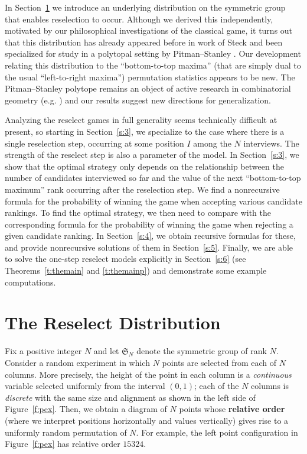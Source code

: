 \documentclass[11pt]{amsart}   %
\theoremstyle{definition}
\theoremstyle{remark}
\numberwithin{equation}{section}
\theoremstyle{theorem}
\renewcommand{\S}{\mathcal{S}}
\renewcommand{\S}{\mathfrak{S}}
\begin{document}
In Section~\ref{s:2} we introduce an underlying distribution on the symmetric
group that enables reselection to occur.  Although we derived this
independently, motivated by our philosophical investigations of the classical
game, it turns out that this distribution has already appeared before in work
of Steck \cite{steck} and been specialized for study in a polytopal setting by
Pitman--Stanley \cite{pitman--stanley}.  Our development relating this
distribution to the ``bottom-to-top maxima'' (that are simply dual to the usual
``left-to-right maxima'') permutation statistics appears to be new.
The Pitman--Stanley polytope remains an object of active research in combinatorial
geometry (e.g. \cite{meszaros--morales}) and our results suggest new directions
for generalization.

Analyzing the reselect games in full generality seems technically difficult at
present, so starting in Section~\ref{s:3}, we specialize to the case where there is a
single reselection step, occurring at some position $I$ among the $N$
interviews.  The strength of the reselect step is also a parameter of the
model.  In Section~\ref{s:3}, we show that the optimal strategy only depends on
the relationship between the number of candidates interviewed so far and the
value of the next ``bottom-to-top maximum'' rank occurring after the
reselection step.  We find a nonrecursive formula for the probability of
winning the game when accepting various candidate rankings.  To find the
optimal strategy, we then need to compare with the corresponding formula for
the probability of winning the game when rejecting a given candidate ranking.
In Section~\ref{s:4}, we obtain recursive formulas for these, and provide
nonrecursive solutions of them in Section~\ref{s:5}.  Finally, we are able to
solve the one-step reselect models explicitly in Section~\ref{s:6} (see
Theorems~\ref{t:themain} and \ref{t:themainp}) and demonstrate some example
computations.


\bigskip
\section{The Reselect Distribution}\label{s:2}

Fix a positive integer $N$ and let $\S_N$ denote the symmetric group of rank
$N$.  Consider a random experiment in which $N$ points are selected from each
of $N$ columns.  More precisely, the height of the point in each column is a
{\em continuous} variable selected uniformly from the interval $(0, 1)$; each
of the $N$ columns is {\em discrete} with the same size and alignment as shown
in the left side of Figure~\ref{f:pex}.  Then, we obtain a diagram of $N$
points whose {\bf relative order} (where we interpret positions horizontally
and values vertically) gives rise to a uniformly random permutation of $N$.
For example, the left point configuration in Figure~\ref{f:pex} has relative
order $15324$.
\end{document}
